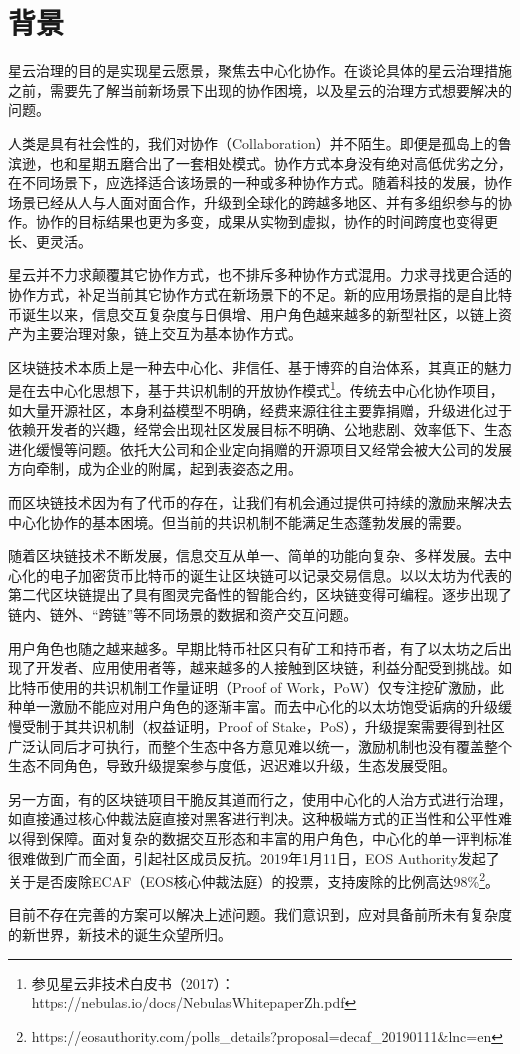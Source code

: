 \section{背景}

星云治理的目的是实现星云愿景，聚焦去中心化协作。在谈论具体的星云治理措施之前，需要先了解当前新场景下出现的协作困境，以及星云的治理方式想要解决的问题。

人类是具有社会性的，我们对协作（Collaboration）并不陌生。即便是孤岛上的鲁滨逊，也和星期五磨合出了一套相处模式。协作方式本身没有绝对高低优劣之分，在不同场景下，应选择适合该场景的一种或多种协作方式。随着科技的发展，协作场景已经从人与人面对面合作，升级到全球化的跨越多地区、并有多组织参与的协作。协作的目标结果也更为多变，成果从实物到虚拟，协作的时间跨度也变得更长、更灵活。

星云并不力求颠覆其它协作方式，也不排斥多种协作方式混用。力求寻找更合适的协作方式，补足当前其它协作方式在新场景下的不足。新的应用场景指的是自比特币诞生以来，信息交互复杂度与日俱增、用户角色越来越多的新型社区，以链上资产为主要治理对象，链上交互为基本协作方式。

区块链技术本质上是⼀种去中心化、⾮信任、基于博弈的⾃治体系，其真正的魅力是在去中⼼化思想下，基于共识机制的开放协作模式\footnote{参见星云非技术白皮书（2017）：https://nebulas.io/docs/NebulasWhitepaperZh.pdf}。传统去中心化协作项目，如大量开源社区，本身利益模型不明确，经费来源往往主要靠捐赠，升级进化过于依赖开发者的兴趣，经常会出现社区发展目标不明确、公地悲剧、效率低下、生态进化缓慢等问题。依托大公司和企业定向捐赠的开源项目又经常会被大公司的发展方向牵制，成为企业的附属，起到表姿态之用。

而区块链技术因为有了代币的存在，让我们有机会通过提供可持续的激励来解决去中心化协作的基本困境。但当前的共识机制不能满足生态蓬勃发展的需要。

随着区块链技术不断发展，信息交互从单⼀、简单的功能向复杂、多样发展。去中心化的电子加密货币比特币的诞生让区块链可以记录交易信息。以以太坊为代表的第二代区块链提出了具有图灵完备性的智能合约，区块链变得可编程。逐步出现了链内、链外、“跨链”等不同场景的数据和资产交互问题。

用户角色也随之越来越多。早期比特币社区只有矿工和持币者，有了以太坊之后出现了开发者、应用使用者等，越来越多的人接触到区块链，利益分配受到挑战。如比特币使用的共识机制工作量证明（Proof of Work，PoW）仅专注挖矿激励，此种单一激励不能应对用户角色的逐渐丰富。而去中心化的以太坊饱受诟病的升级缓慢受制于其共识机制（权益证明，Proof of Stake，PoS），升级提案需要得到社区广泛认同后才可执行，而整个生态中各方意见难以统一，激励机制也没有覆盖整个生态不同角色，导致升级提案参与度低，迟迟难以升级，生态发展受阻。

另一方面，有的区块链项目干脆反其道而行之，使用中心化的人治方式进行治理，如直接通过核心仲裁法庭直接对黑客进行判决。这种极端方式的正当性和公平性难以得到保障。面对复杂的数据交互形态和丰富的用户角色，中心化的单一评判标准很难做到广而全面，引起社区成员反抗。2019年1月11日，EOS Authority发起了关于是否废除ECAF（EOS核心仲裁法庭）的投票，支持废除的比例高达98\%\footnote{https://eosauthority.com/polls_details?proposal=decaf_20190111\&lnc=en}。

目前不存在完善的方案可以解决上述问题。我们意识到，应对具备前所未有复杂度的新世界，新技术的诞生众望所归。

